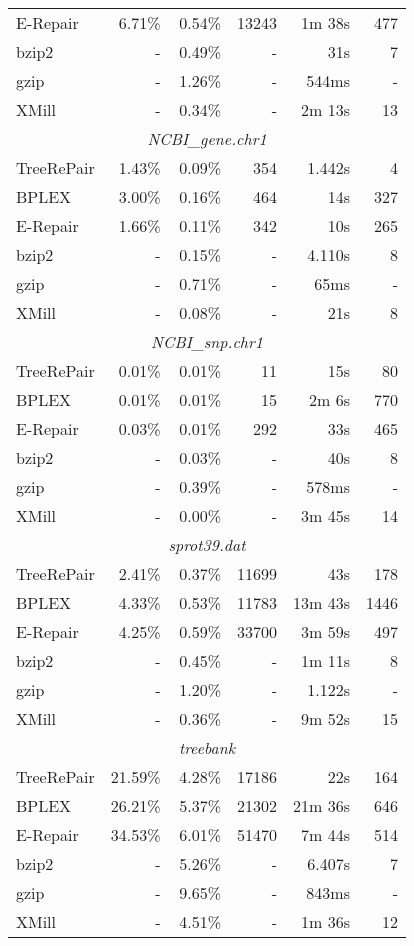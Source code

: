 \documentclass[12pt]{llncs}
\begin{document}
\begin{longtable}{lrrrrr}
			E-Repair&6.71\%&0.54\%&13243&1m 38s&477\\*
			bzip2&-&0.49\%&-&31s&7\\*
			gzip&-&1.26\%&-&544ms&-\\*
			XMill&-&0.34\%&-&2m 13s&13\\
			\midrule\multicolumn{6}{c}{\emph{NCBI\_gene.chr1}}\\*
			TreeRePair&1.43\%&0.09\%&354&1.442s&4\\*
			BPLEX&3.00\%&0.16\%&464&14s&327\\*
			E-Repair&1.66\%&0.11\%&342&10s&265\\*
			bzip2&-&0.15\%&-&4.110s&8\\*
			gzip&-&0.71\%&-&65ms&-\\*
			XMill&-&0.08\%&-&21s&8\\
			\midrule\multicolumn{6}{c}{\emph{NCBI\_snp.chr1}}\\*
			TreeRePair&\,0.01\%&\,0.01\%&11&15s&80\\*
			BPLEX&\,0.01\%&\,0.01\%&15&2m 6s&770\\*
			E-Repair&0.03\%&0.01\%&292&33s&465\\*
			bzip2&-&0.03\%&-&40s&8\\*
			gzip&-&0.39\%&-&578ms&-\\*
			XMill&-&0.00\%&-&3m 45s&14\\
			\midrule\multicolumn{6}{c}{\emph{sprot39.dat}}\\*
			TreeRePair&2.41\%&0.37\%&11699&43s&178\\*
			BPLEX&4.33\%&0.53\%&11783&13m 43s&1446\\*
			E-Repair&4.25\%&0.59\%&33700&3m 59s&497\\*
			bzip2&-&0.45\%&-&1m 11s&8\\*
			gzip&-&1.20\%&-&1.122s&-\\*
			XMill&-&0.36\%&-&9m 52s&15\\
			\midrule\multicolumn{6}{c}{\emph{treebank}}\\*
			TreeRePair&21.59\%&4.28\%&17186&22s&164\\*
			BPLEX&26.21\%&5.37\%&21302&21m 36s&646\\*
			E-Repair&34.53\%&6.01\%&51470&7m 44s&514\\*
			bzip2&-&5.26\%&-&6.407s&7\\*
			gzip&-&9.65\%&-&843ms&-\\*
			XMill&-&4.51\%&-&1m 36s&12\\
			\bottomrule
		\end{longtable}
\end{document}

